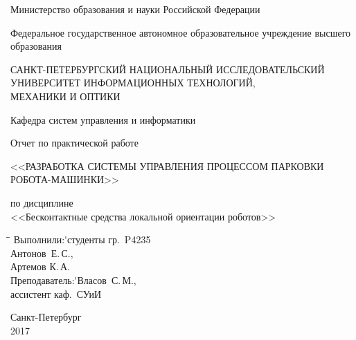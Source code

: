 
\begin{titlepage}

    \begin{center}

        Министерство образования и науки Российской Федерации

        \vspace{0.5cm}

        Федеральное государственное автономное образовательное учреждение высшего образования

        \vspace{0.5cm}

        САНКТ-ПЕТЕРБУРГСКИЙ НАЦИОНАЛЬНЫЙ ИССЛЕДОВАТЕЛЬСКИЙ\\
        УНИВЕРСИТЕТ ИНФОРМАЦИОННЫХ ТЕХНОЛОГИЙ,\\
        МЕХАНИКИ И ОПТИКИ

        \vspace{2.0cm}

        Кафедра систем управления и информатики

        \vspace{2.0cm}

        Отчет по практической работе

        \vspace{0.2cm}

        <<РАЗРАБОТКА СИСТЕМЫ УПРАВЛЕНИЯ ПРОЦЕССОМ ПАРКОВКИ РОБОТА-МАШИНКИ>>

        \vspace{0.2cm}

        по дисциплине \\ <<Бесконтактные средства локальной ориентации роботов>>

    \end{center}

    \vspace{3.0cm}

    \begin{tabbing}
        \hspace{11cm}\=\hspace{0.3cm}\=\+\kill
        Выполнили:\'\>студенты гр.~P4235\+\\
        Антонов~Е.\,С.,\\
        Артемов К.\,А.\-\\[\medskipamount]
        Преподаватель:\'\>Власов~С.\,М.,\+\\
        ассистент каф.~СУиИ
    \end{tabbing}

    \vspace{\fill}

    \begin{center}
        Санкт-Петербург \\ 2017
    \end{center}

\end{titlepage}
\newpage
